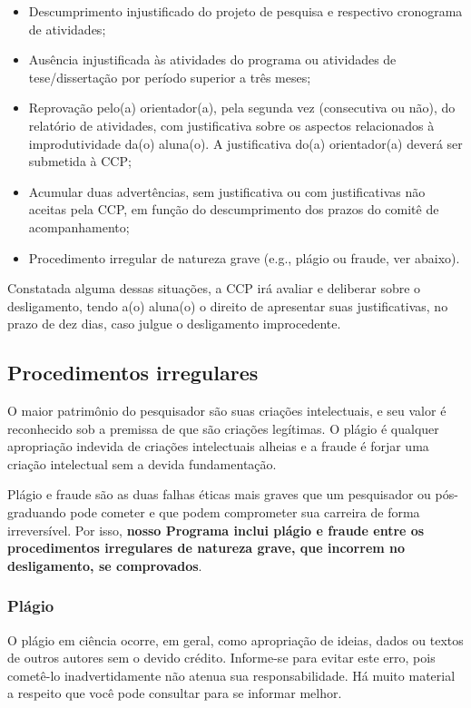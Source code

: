 \begin{itemize}
\item Descumprimento injustificado do projeto de pesquisa e respectivo
  cronograma de atividades;
\item Ausência injustificada às atividades do programa ou atividades
  de tese/dissertação por período superior a três meses;
\item Reprovação pelo(a) orientador(a), pela segunda vez (consecutiva
  ou não), do relatório de atividades, com justificativa sobre os
  aspectos relacionados à improdutividade da(o) aluna(o). A
  justificativa do(a) orientador(a) deverá ser submetida à CCP;
\item Acumular duas advertências, sem justificativa ou com
  justificativas não aceitas pela CCP, em função do descumprimento dos
  prazos do comitê de acompanhamento;
\item Procedimento irregular de natureza grave (e.g., plágio ou fraude, ver abaixo).
\end{itemize}

Constatada alguma dessas situações, a CCP irá avaliar e deliberar
sobre o desligamento, tendo a(o) aluna(o) o direito de apresentar suas
justificativas, no prazo de dez dias, caso julgue o desligamento
improcedente.

\subsection{Procedimentos irregulares}

O maior patrimônio do pesquisador são suas criações intelectuais, e
seu valor é reconhecido sob a premissa de que são criações
legítimas. O plágio é qualquer apropriação indevida de criações
intelectuais alheias e a fraude é forjar uma criação intelectual sem a
devida fundamentação.

Plágio e fraude são as duas falhas éticas mais graves que um
pesquisador ou pós-graduando pode cometer e que podem comprometer sua
carreira de forma irreversível. Por isso, \textbf{nosso Programa
  inclui plágio e fraude entre os procedimentos irregulares de
  natureza grave, que incorrem no desligamento, se comprovados}.

\subsubsection{Plágio}
O plágio em ciência ocorre, em geral, como apropriação de ideias,
dados ou textos de outros autores sem o devido crédito. Informe-se
para evitar este erro, pois cometê-lo inadvertidamente não atenua sua
responsabilidade. Há muito material a respeito que você pode consultar
para se informar melhor.

